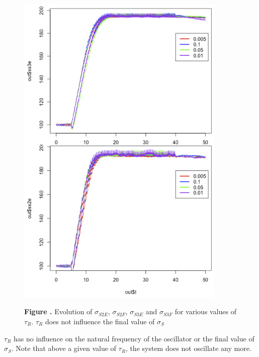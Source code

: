 \documentclass{report}
\begin{document}
\begin{figure}[h!]
\begin{center}
\includegraphics[width=10cm]{figures/varying_tauR-ss.png}
\end{center}
 \textbf{\label{fig:05} Figure . }{Evolution of $\sigma_{S2E}$, $\sigma_{S2F}$, $\sigma_{S3E}$ and $\sigma_{S3F}$  for various values of $\tau_R$. $\tau_R$ does not influence the final value of $\sigma_S$}
\end{figure}

$\tau_R$ has no influence on the natural frequency of the oscillator or the final value of $\sigma_S$. Note that above a given value of $\tau_R$, the system does not oscillate any more.
\end{document}
